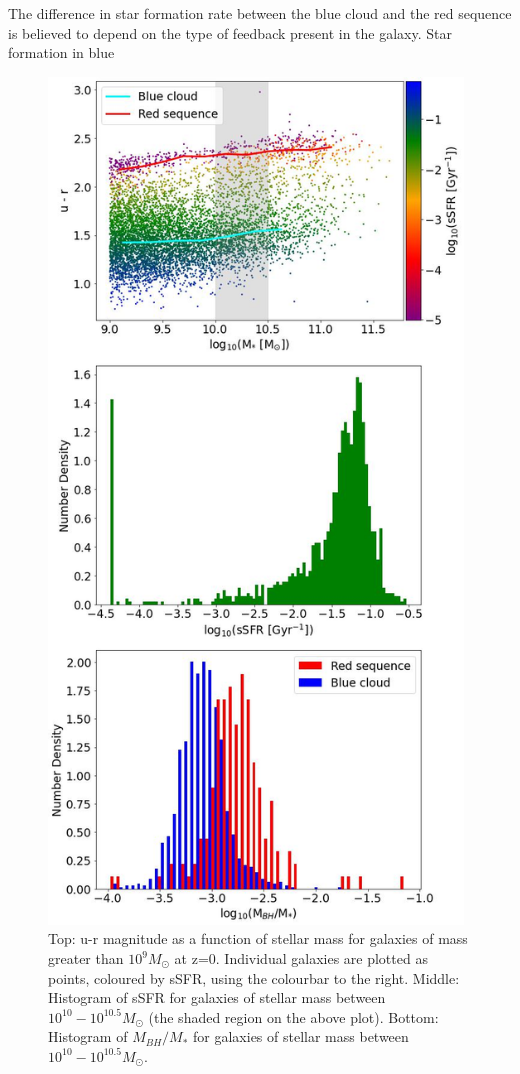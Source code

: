 \documentclass[12pt, twocolumn]{revtex4}    %
\begin{document}
The difference in star formation rate between the blue cloud and the red sequence is believed to depend on the type of feedback present in the galaxy. Star formation in blue

\onecolumngrid


\begin{figure}[H]
\centering
\includegraphics[width=11cm]{Plot_1.jpeg}
\caption{Top: u-r magnitude as a function of stellar mass for galaxies of mass greater than $10^9M_\odot$ at z=0. Individual galaxies are plotted as points, coloured by sSFR, using the colourbar to the right. Middle: Histogram of sSFR for galaxies of stellar mass between $10^{10} - 10^{10.5}M_\odot$ (the shaded region on the above plot). Bottom: Histogram of $M_{BH}/M_*$ for galaxies of stellar mass between $10^{10} - 10^{10.5}M_\odot$.}
\label{fig:1}
\end{figure}
\twocolumngrid
\end{document}
